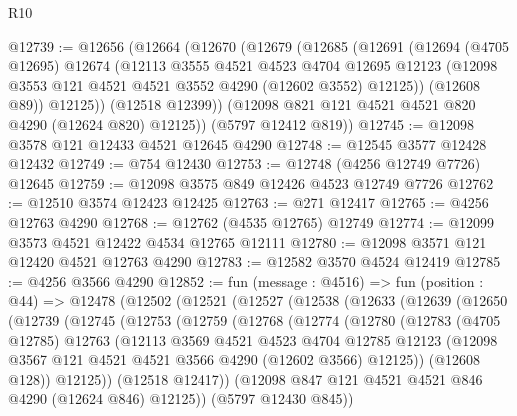 \begin{lexlean}{R10}
\begin{coremodule}
@12739 := @12656
    (@12664
      (@12670
        (@12679
          (@12685
            (@12691
              (@12694
                (@4705 @12695)
                @12674
                (@12113
                  @3555
                  @4521
                  @4523
                  @4704
                  @12695
                  @12123
                  (@12098 @3553 @121 @4521 @4521 @3552 @4290 (@12602 @3552) @12125))
                (@12608 @89))
              @12125))
          (@12518 @12399))
        (@12098 @821 @121 @4521 @4521 @820 @4290 (@12624 @820) @12125))
      (@5797 @12412 @819))
@12745 := @12098 @3578 @121 @12433 @4521 @12645 @4290
@12748 := @12545 @3577 @12428 @12432
@12749 := @754 @12430
@12753 := @12748 (@4256 @12749 @7726) @12645
@12759 := @12098 @3575 @849 @12426 @4523 @12749 @7726
@12762 := @12510 @3574 @12423 @12425
@12763 := @271 @12417
@12765 := @4256 @12763 @4290
@12768 := @12762 (@4535 @12765) @12749
@12774 := @12099 @3573 @4521 @12422 @4534 @12765 @12111
@12780 := @12098 @3571 @121 @12420 @4521 @12763 @4290
@12783 := @12582 @3570 @4524 @12419
@12785 := @4256 @3566 @4290
@12852 := fun (message : @4516) =>
  fun (position : @44) =>
  @12478
    (@12502
      (@12521
        (@12527
          (@12538
            (@12633
              (@12639
                (@12650
                  (@12739
                    (@12745
                      (@12753
                        (@12759
                          (@12768
                            (@12774
                              (@12780
                                (@12783
                                  (@4705 @12785)
                                  @12763
                                  (@12113
                                    @3569
                                    @4521
                                    @4523
                                    @4704
                                    @12785
                                    @12123
                                    (@12098
                                      @3567
                                      @121
                                      @4521
                                      @4521
                                      @3566
                                      @4290
                                      (@12602 @3566)
                                      @12125))
                                  (@12608 @128))
                                @12125))
                            (@12518 @12417))
                          (@12098 @847 @121 @4521 @4521 @846 @4290 (@12624 @846) @12125))
                        (@5797 @12430 @845))

\end{coremodule}
\end{lexlean}

